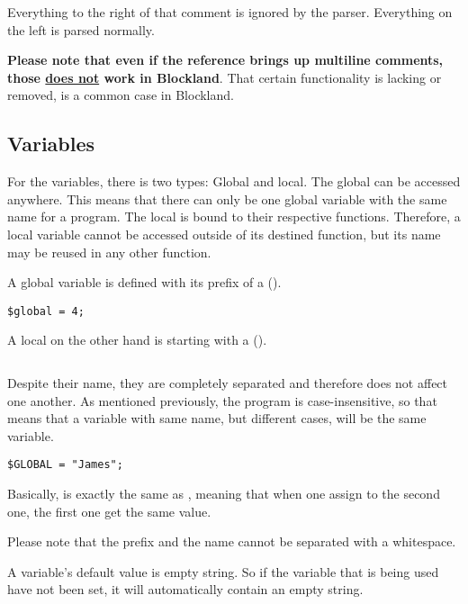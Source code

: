 Everything to the right of that comment is ignored by the parser. Everything on the left is parsed normally.

\textbf{Please note that even if the reference brings up multiline comments, those \underline{does not} work in Blockland}. That certain functionality is lacking or removed, is a common case in Blockland.

\subsection{Variables}

For the variables, there is two types: Global and local. The global can be accessed anywhere. This means that there can only be one global variable with the same name for a program. The local is bound to their respective functions. Therefore, a local variable cannot be accessed outside of its destined function, but its name may be reused in any other function.

A global variable is defined with its prefix of a  (\code{\$}).

\begin{lstlisting}[style=ts]
$global = 4;
\end{lstlisting}

A local on the other hand is starting with a  (\code{\%}).

\begin{lstlisting}[style=ts]
%local = 4;
\end{lstlisting}

Despite their name, they are completely separated and therefore does not affect one another. As mentioned previously, the program is case-insensitive, so that means that a variable with same name, but different cases, will be the same variable.

\begin{lstlisting}[style=ts]
$GLOBAL = "James";
\end{lstlisting}

Basically,  is exactly the same as , meaning that when one assign to the second one, the first one get the same value.

Please note that the prefix and the name cannot be separated with a whitespace.

A variable's default value is empty string. So if the variable that is being used have not been set, it will automatically contain an empty string.

